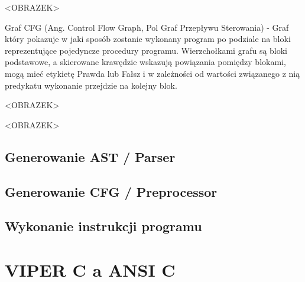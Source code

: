 \documentclass[a4paper,twoside,openright,11pt]{report}
\begin{document}
\par <OBRAZEK>

\par Graf CFG (Ang. Control Flow Graph, Pol Graf Przepływu Sterowania) - Graf który pokazuje w jaki sposób zostanie wykonany program po podziale na bloki reprezentujące pojedyncze procedury programu. Wierzchołkami grafu są bloki podstawowe, a skierowane krawędzie wskazują powiązania pomiędzy blokami, mogą mieć etykietę Prawda lub Fałsz i w zależności od wartości związanego z nią predykatu wykonanie przejdzie na kolejny blok.

\par <OBRAZEK>

\par <OBRAZEK>

  \section {Generowanie AST / Parser}
  \section {Generowanie CFG / Preprocessor}
  \section {Wykonanie instrukcji programu}

  \chapter {VIPER C a ANSI C}
\end{document}
